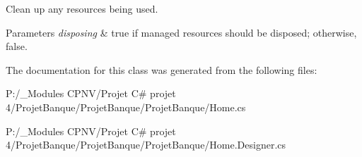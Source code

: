 Clean up any resources being used. 


\begin{DoxyParams}{Parameters}
{\em disposing} & true if managed resources should be disposed; otherwise, false.\\
\hline
\end{DoxyParams}


The documentation for this class was generated from the following files\+:\begin{DoxyCompactItemize}
\item 
P\+:/\+\_\+\+Modules C\+P\+N\+V/\+Projet C\# projet 4/\+Projet\+Banque/\+Projet\+Banque/\+Projet\+Banque/Home.\+cs\item 
P\+:/\+\_\+\+Modules C\+P\+N\+V/\+Projet C\# projet 4/\+Projet\+Banque/\+Projet\+Banque/\+Projet\+Banque/Home.\+Designer.\+cs\end{DoxyCompactItemize}
